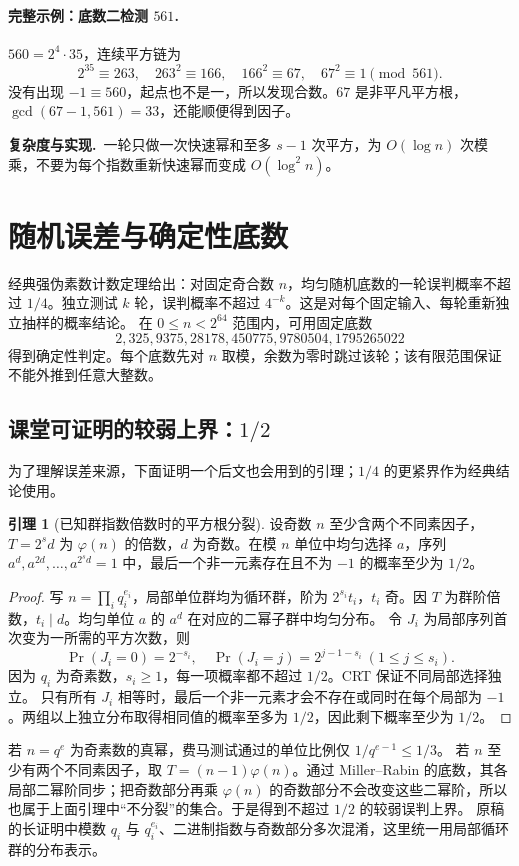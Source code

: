 \documentclass[UTF8,a4paper,11pt,oneside,openany,fontset=fandol]{ctexbook}
\theoremstyle{definition}
\newtheorem{lemma}[definition]{引理}
\newcommand{\cost}{\par\noindent\textbf{复杂度与实现.}\ }
\begin{document}
\paragraph{完整示例：底数二检测 $561$.}
$560=2^4\cdot35$，连续平方链为
\[
 2^{35}\equiv263,\quad263^2\equiv166,\quad166^2\equiv67,\quad67^2\equiv1\pmod{561}.
\]
没有出现 $-1\equiv560$，起点也不是一，所以发现合数。$67$ 是非平凡平方根，$\gcd(67-1,561)=33$，还能顺便得到因子。
\cost 一轮只做一次快速幂和至多 $s-1$ 次平方，为 $O(\log n)$ 次模乘，不要为每个指数重新快速幂而变成 $O(\log^2n)$。


\section{随机误差与确定性底数}
经典强伪素数计数定理给出：对固定奇合数 $n$，均匀随机底数的一轮误判概率不超过 $1/4$。独立测试 $k$ 轮，误判概率不超过 $4^{-k}$。这是对每个固定输入、每轮重新独立抽样的概率结论。
在 $0\le n<2^{64}$ 范围内，可用固定底数
\[
 2,325,9375,28178,450775,9780504,1795265022
\]
得到确定性判定。每个底数先对 $n$ 取模，余数为零时跳过该轮；该有限范围保证不能外推到任意大整数。


\subsection{课堂可证明的较弱上界：\texorpdfstring{$1/2$}{1/2}}
为了理解误差来源，下面证明一个后文也会用到的引理；$1/4$ 的更紧界作为经典结论使用。
\begin{lemma}[已知群指数倍数时的平方根分裂]
设奇数 $n$ 至少含两个不同素因子，$T=2^s d$ 为 $\varphi(n)$ 的倍数，$d$ 为奇数。在模 $n$ 单位中均匀选择 $a$，序列 $a^d,a^{2d},\ldots,a^{2^sd}=1$ 中，最后一个非一元素存在且不为 $-1$ 的概率至少为 $1/2$。
\end{lemma}
\begin{proof}
写 $n=\prod_iq_i^{e_i}$，局部单位群均为循环群，阶为 $2^{s_i}t_i$，$t_i$ 奇。因 $T$ 为群阶倍数，$t_i\mid d$。均匀单位 $a$ 的 $a^d$ 在对应的二幂子群中均匀分布。
令 $J_i$ 为局部序列首次变为一所需的平方次数，则
\[
\Pr(J_i=0)=2^{-s_i},\quad
\Pr(J_i=j)=2^{j-1-s_i}\ (1\le j\le s_i).
\]
因为 $q_i$ 为奇素数，$s_i\ge1$，每一项概率都不超过 $1/2$。CRT 保证不同局部选择独立。
只有所有 $J_i$ 相等时，最后一个非一元素才会不存在或同时在每个局部为 $-1$。两组以上独立分布取得相同值的概率至多为 $1/2$，因此剩下概率至少为 $1/2$。
\end{proof}
若 $n=q^e$ 为奇素数的真幂，费马测试通过的单位比例仅 $1/q^{e-1}\le1/3$。
若 $n$ 至少有两个不同素因子，取 $T=(n-1)\varphi(n)$。通过 Miller--Rabin 的底数，其各局部二幂阶同步；把奇数部分再乘 $\varphi(n)$ 的奇数部分不会改变这些二幂阶，所以也属于上面引理中“不分裂”的集合。于是得到不超过 $1/2$ 的较弱误判上界。
原稿的长证明中模数 $q_i$ 与 $q_i^{e_i}$、二进制指数与奇数部分多次混淆，这里统一用局部循环群的分布表示。
\end{document}
